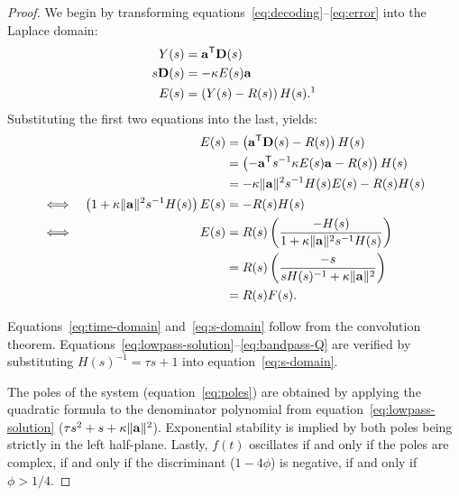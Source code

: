 \begin{proof}
We begin by transforming equations~\ref{eq:decoding}--\ref{eq:error} into the Laplace domain:
\begin{align*}
Y(s) &= \transpose{\V{a}} \V{D}(s) \\
s\V{D}(s) &= - \kappa E(s) \V{a} \\
E(s) &= \left(Y(s) - R(s) \right) H(s) \text{.\footnotemark}
\end{align*}
%
Substituting the first two equations into the last, yields:
\begin{align*}
&& E(s) &= \left( \transpose{\V{a}} \V{D}(s) - R(s) \right) H(s) \\
&& &= \left( - \transpose{\V{a}} s^{-1} \kappa E(s) \V{a} - R(s) \right) H(s) \\
&& &= - \kappa \|\V{a}\|^2 s^{-1} H(s) E(s) - R(s) H(s) \\
\iff && \left(1 + \kappa \|\V{a}\|^2 s^{-1} H(s) \right) E(s) &= - R(s) H(s) \\
\iff && E(s) &= R(s) \left( \frac{-H(s)}{1 + \kappa \|\V{a}\|^2 s^{-1} H(s)} \right) \\
&& &= R(s) \left( \frac{- s}{s H(s)^{-1} + \kappa \|\V{a}\|^2} \right) \\
&& &= R(s) F(s) \text{.} %
\end{align*}

Equations~\ref{eq:time-domain} and~\ref{eq:s-domain} follow from the convolution theorem.
Equations~\ref{eq:lowpass-solution}--\ref{eq:bandpass-Q} are verified by substituting $H(s)^{-1} = \tau s + 1$ into equation~\ref{eq:s-domain}.

The poles of the system (equation~\ref{eq:poles}) are obtained by applying the quadratic formula to the denominator polynomial from equation~\ref{eq:lowpass-solution} ($\tau s^2 + s + \kappa \|\mathbf{a}\|^2$).
Exponential stability is implied by both poles being strictly in the left half-plane.
Lastly, $f(t)$ oscillates if and only if the poles are complex, if and only if the discriminant ($1 - 4 \phi$) is negative, if and only if $\phi > 1 / 4$.
\end{proof}


